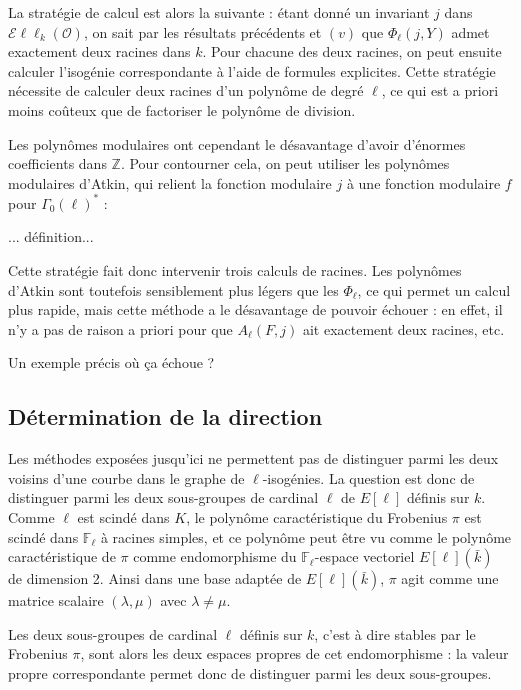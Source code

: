 \documentclass[11pt,a4paper]{article}
\newcommand{\Z}{\mathbb{Z}}
\newcommand{\F}{\mathbb{F}}
\renewcommand{\O}{\mathcal{O}}
\newcommand{\Ell}{\mathcal{E}\ell\ell}
\theoremstyle{definition}
\begin{document}
La stratégie de calcul est alors la suivante : étant donné un invariant $j$ dans $\Ell_k(\O)$, on sait par les résultats précédents et $(v)$ que $\Phi_\ell(j,Y)$ admet exactement deux racines dans $k$. Pour chacune des deux racines, on peut ensuite calculer l'isogénie correspondante à l'aide de formules explicites. Cette stratégie nécessite de calculer deux racines d'un polynôme de degré $\ell$, ce qui est a priori moins coûteux que de factoriser le polynôme de division.

Les polynômes modulaires ont cependant le désavantage d'avoir d'énormes coefficients dans $\Z$. Pour contourner cela, on peut utiliser les polynômes modulaires d'Atkin, qui relient la fonction modulaire $j$ à une fonction modulaire $f$ pour $\Gamma_0(\ell)^*$ :

... définition...

Cette stratégie fait donc intervenir trois calculs de racines. Les polynômes d'Atkin sont toutefois sensiblement plus légers que les $\Phi_\ell$, ce qui permet un calcul plus rapide, mais cette méthode a le désavantage de pouvoir échouer : en effet, il n'y a pas de raison a priori pour que $A_\ell(F,j)$ ait exactement deux racines, etc.

Un exemple précis où ça échoue ?



\newpage


\subsection{Détermination de la direction}



Les méthodes exposées jusqu'ici ne permettent pas de distinguer parmi les deux voisins d'une courbe dans le graphe de $\ell$-isogénies. La question est donc de distinguer parmi les deux sous-groupes de cardinal $\ell$ de $E[\ell]$ définis sur $k$. Comme $\ell$ est scindé dans $K$, le polynôme caractéristique du Frobenius $\pi$ est scindé dans $\F_\ell$ à racines simples, et ce polynôme peut être vu comme le polynôme caractéristique de $\pi$ comme endomorphisme du $\F_\ell$-espace vectoriel $E[\ell](\bar{k})$ de dimension 2. Ainsi dans une base adaptée de $E[\ell](\bar{k})$, $\pi$ agit comme une matrice scalaire $(\lambda,\mu)$ avec $\lambda\neq\mu$.

Les deux sous-groupes de cardinal $\ell$ définis sur $k$, c'est à dire stables par le Frobenius $\pi$, sont alors les deux espaces propres de cet endomorphisme : la valeur propre correspondante permet donc de distinguer parmi les deux sous-groupes.
\end{document}
